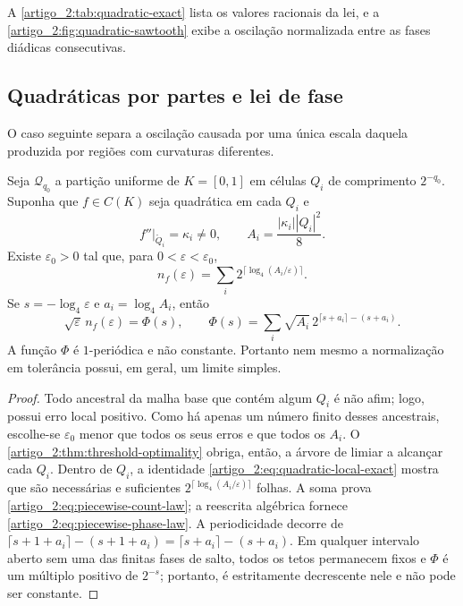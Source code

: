 A \cref{artigo_2:tab:quadratic-exact} lista os valores racionais da lei, e a
\cref{artigo_2:fig:quadratic-sawtooth} exibe a oscilação normalizada entre as fases
diádicas consecutivas.

\subsection{Quadráticas por partes e lei de fase}

O caso seguinte separa a oscilação causada por uma única escala daquela
produzida por regiões com curvaturas diferentes.

\begin{theorem}\label{map:artigo_2:12.2}
\label{artigo_2:thm:piecewise-quadratic-count}
Seja $\mathcal Q_{q_0}$ a partição uniforme de $K=[0,1]$ em células
$Q_i$ de comprimento $2^{-q_0}$. Suponha que $f\in C(K)$ seja quadrática
em cada $Q_i$ e
\[
 f''|_{\mathring Q_i}=\kappa_i\ne0,
 \qquad
 A_i=\frac{|\kappa_i||Q_i|^2}{8}.
\]
Existe $\varepsilon_0>0$ tal que, para
$0<\varepsilon<\varepsilon_0$,
\begin{equation}
 n_f(\varepsilon)
 =\sum_i2^{\lceil\log_4(A_i/\varepsilon)\rceil}.
 \label{artigo_2:eq:piecewise-count-law}
\end{equation}
Se $s=-\log_4\varepsilon$ e $a_i=\log_4A_i$, então
\begin{equation}
 \sqrt\varepsilon\,n_f(\varepsilon)
 =\Phi(s),
 \qquad
 \Phi(s)=\sum_i\sqrt{A_i}\,
 2^{\lceil s+a_i\rceil-(s+a_i)}.
 \label{artigo_2:eq:piecewise-phase-law}
\end{equation}
A função $\Phi$ é $1$-periódica e não constante. Portanto nem mesmo a
normalização em tolerância possui, em geral, um limite simples.
\end{theorem}

\begin{proof}
Todo ancestral da malha base que contém algum $Q_i$ é não afim; logo, possui
erro local positivo. Como há apenas um número finito desses ancestrais,
escolhe-se $\varepsilon_0$ menor que todos os seus erros e que todos os $A_i$.
O \cref{artigo_2:thm:threshold-optimality} obriga, então, a árvore de limiar a alcançar
cada $Q_i$. Dentro de $Q_i$, a identidade
\eqref{artigo_2:eq:quadratic-local-exact} mostra que são necessárias e suficientes
$2^{\lceil\log_4(A_i/\varepsilon)\rceil}$ folhas. A soma prova
\eqref{artigo_2:eq:piecewise-count-law}; a reescrita algébrica fornece
\eqref{artigo_2:eq:piecewise-phase-law}. A periodicidade decorre de
$\lceil s+1+a_i\rceil-(s+1+a_i)=\lceil s+a_i\rceil-(s+a_i)$.
Em qualquer intervalo aberto sem uma das finitas fases de salto, todos
os tetos permanecem fixos e $\Phi$ é um múltiplo positivo de $2^{-s}$;
portanto, é estritamente decrescente nele e não pode ser constante.
\end{proof}


